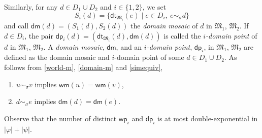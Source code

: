 \documentclass[10pt,a4paper]{amsart}
\theoremstyle{plain}
\theoremstyle{definition}
\newcommand{\dt}{\mathsf{dt}}
\newcommand{\wm}{\mathsf{wm}}
\newcommand{\dm}{\mathsf{dm}}
\newcommand{\iwp}{\mathsf{wp}_i}
\newcommand{\idp}{\mathsf{dp}_i}
\begin{document}
Similarly, for any $d\in D_{1}\cup D_{2}$ and $i \in \{1,2\}$, we set
%
\begin{equation}\label{domain-m}
S_{i}(d) = \{ \dt_{\mathfrak{M}_{i}}(e) \mid e \in D_{i}, \ e \sim_{\sigma} d\}
\end{equation}
%
and call $\dm(d) = (S_{1}(d),S_{2}(d))$ the \emph{domain mosaic} of $d$ in $\mathfrak{M}_{1}$, $\mathfrak{M}_{2}$. If $d\in D_{i}$, the pair $\idp(d) = (\dt_{\mathfrak{M}_{i}}(d), \dm(d))$ is called the \emph{$i$-domain point} of $d$ in $\mathfrak{M}_{1}$, $\mathfrak{M}_{2}$. A \emph{domain mosaic}, $\dm$, and an  \emph{$i$-domain point}, $\idp$, in $\mathfrak{M}_{1}$, $\mathfrak{M}_{2}$ are defined as the domain mosaic and $i$-domain point of some $d\in D_{1} \cup D_2$. As follows from \eqref{world-m}, \eqref{domain-m} and \eqref{simequiv},
%
\begin{enumerate}[style=multiline,leftmargin=1.1cm]
\item[\textbf{(wm)}] $u \sim_{\sigma} v$ implies $\wm(u) = \wm(v)$,
 
\item[\textbf{(dm)}] $d \sim_{\sigma} e$ implies $\dm(d) = \dm(e)$.
\end{enumerate}
%
Observe that the number of distinct $\iwp$ and $\idp$ is at most double-exponential in  $|\varphi|+|\psi|$. 
%
\end{document}
